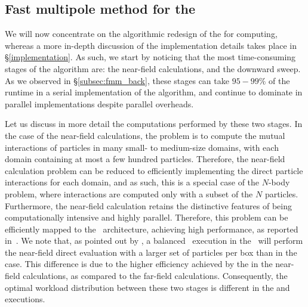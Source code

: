 

\subsection{Fast multipole method for the {\gpu}}

We will now concentrate on the algorithmic redesign of the {\fmm} for {\gpu} computing, whereas a more in-depth discussion of the implementation details takes place in \S\ref{implementation}. As such, we start by noticing that the most time-consuming stages of the {\fmm} algorithm are: the near-field calculations, and the downward sweep. As we observed in \S\ref{subsec:fmm_back}, these stages can take $95-99\%$ of the runtime in a serial implementation of the algorithm, and continue to dominate in parallel implementations despite parallel overheads.


Let us discuss in more detail the computations performed by these two stages.  In the case of the near-field calculations, the problem is to compute the mutual interactions of particles in many small- to medium-size domains, with each domain containing at most a few hundred particles. Therefore, the near-field calculation problem can be reduced to efficiently implementing the direct particle interactions for each domain, and as such, this is a special case of the $N$-body problem, where interactions are computed only with a subset of the $N$ particles. Furthermore, the near-field calculation retains the distinctive features of being computationally intensive and highly parallel. Therefore, this problem can be efficiently mapped to the \gpu\ architecture, achieving high performance, as reported in~\cite{NylandHarrisPrins2007,BellemanEtal2008}.
We note that, as pointed out by \cite{NylandHarrisPrins2007}, a balanced \fmm\ execution in the \gpu\ will perform the near-field direct evaluation with a larger set of particles per box than in the {\cpu} case. This difference is due to the higher efficiency achieved by the {\gpu} in the near-field calculations, as compared to the far-field calculations. Consequently, the optimal workload distribution between these two stages is different in the {\gpu} and {\cpu} executions.

